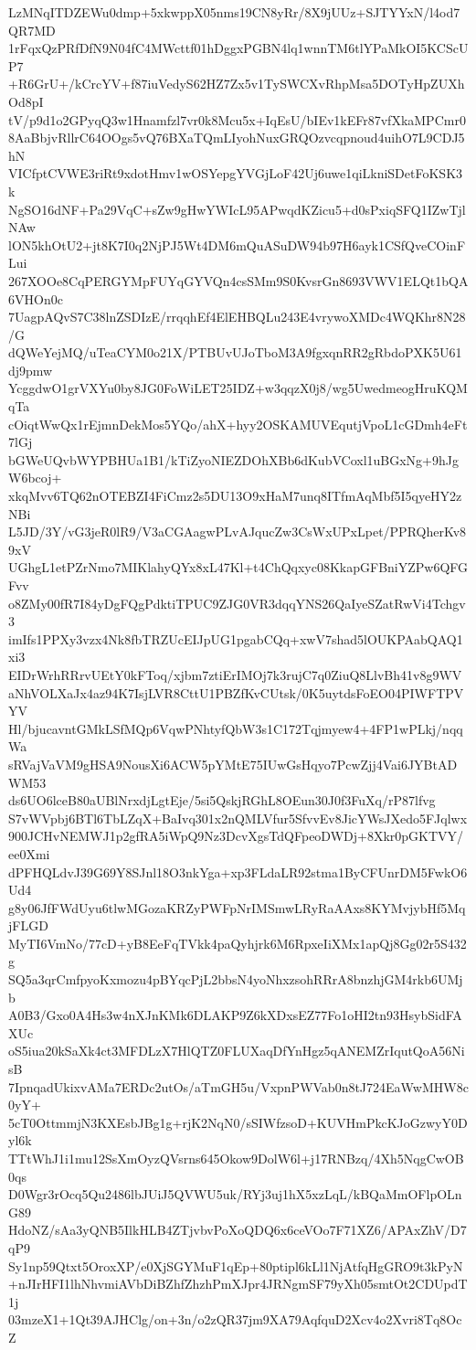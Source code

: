 LzMNqITDZEWu0dmp+5xkwppX05nms19CN8yRr/8X9jUUz+SJTYYxN/l4od7QR7MD
1rFqxQzPRfDfN9N04fC4MWcttf01hDggxPGBN4lq1wnnTM6tlYPaMkOI5KCScUP7
+R6GrU+/kCrcYV+f87iuVedyS62HZ7Zx5v1TySWCXvRhpMsa5DOTyHpZUXhOd8pI
tV/p9d1o2GPyqQ3w1Hnamfzl7vr0k8Mcu5x+IqEsU/bIEv1kEFr87vfXkaMPCmr0
8AaBbjvRllrC64OOgs5vQ76BXaTQmLIyohNuxGRQOzvcqpnoud4uihO7L9CDJ5hN
VICfptCVWE3riRt9xdotHmv1wOSYepgYVGjLoF42Uj6uwe1qiLkniSDetFoKSK3k
NgSO16dNF+Pa29VqC+sZw9gHwYWIcL95APwqdKZicu5+d0sPxiqSFQ1IZwTjlNAw
lON5khOtU2+jt8K7I0q2NjPJ5Wt4DM6mQuASuDW94b97H6ayk1CSfQveCOinFLui
267XOOe8CqPERGYMpFUYqGYVQn4csSMm9S0KvsrGn8693VWV1ELQt1bQA6VHOn0c
7UagpAQvS7C38lnZSDIzE/rrqqhEf4ElEHBQLu243E4vrywoXMDc4WQKhr8N28/G
dQWeYejMQ/uTeaCYM0o21X/PTBUvUJoTboM3A9fgxqnRR2gRbdoPXK5U61dj9pmw
YcggdwO1grVXYu0by8JG0FoWiLET25IDZ+w3qqzX0j8/wg5UwedmeogHruKQMqTa
cOiqtWwQx1rEjmnDekMos5YQo/ahX+hyy2OSKAMUVEqutjVpoL1cGDmh4eFt7lGj
bGWeUQvbWYPBHUa1B1/kTiZyoNIEZDOhXBb6dKubVCoxl1uBGxNg+9hJgW6bcoj+
xkqMvv6TQ62nOTEBZI4FiCmz2s5DU13O9xHaM7unq8ITfmAqMbf5I5qyeHY2zNBi
L5JD/3Y/vG3jeR0lR9/V3aCGAagwPLvAJqucZw3CsWxUPxLpet/PPRQherKv89xV
UGhgL1etPZrNmo7MIKlahyQYx8xL47Kl+t4ChQqxyc08KkapGFBniYZPw6QFGFvv
o8ZMy00fR7I84yDgFQgPdktiTPUC9ZJG0VR3dqqYNS26QaIyeSZatRwVi4Tchgv3
imIfs1PPXy3vzx4Nk8fbTRZUcEIJpUG1pgabCQq+xwV7shad5lOUKPAabQAQ1xi3
EIDrWrhRRrvUEtY0kFToq/xjbm7ztiErIMOj7k3rujC7q0ZiuQ8LlvBh41v8g9WV
aNhVOLXaJx4az94K7IsjLVR8CttU1PBZfKvCUtsk/0K5uytdsFoEO04PIWFTPVYV
Hl/bjucavntGMkLSfMQp6VqwPNhtyfQbW3s1C172Tqjmyew4+4FP1wPLkj/nqqWa
sRVajVaVM9gHSA9NousXi6ACW5pYMtE75IUwGsHqyo7PcwZjj4Vai6JYBtADWM53
ds6UO6lceB80aUBlNrxdjLgtEje/5si5QskjRGhL8OEun30J0f3FuXq/rP87lfvg
S7vWVpbj6BTl6TbLZqX+BaIvq301x2nQMLVfur5SfvvEv8JicYWsJXedo5FJqlwx
900JCHvNEMWJ1p2gfRA5iWpQ9Nz3DcvXgsTdQFpeoDWDj+8Xkr0pGKTVY/ee0Xmi
dPFHQLdvJ39G69Y8SJnl18O3nkYga+xp3FLdaLR92stma1ByCFUnrDM5FwkO6Ud4
g8y06JfFWdUyu6tlwMGozaKRZyPWFpNrIMSmwLRyRaAAxs8KYMvjybHf5MqjFLGD
MyTI6VmNo/77cD+yB8EeFqTVkk4paQyhjrk6M6RpxeIiXMx1apQj8Gg02r5S432g
SQ5a3qrCmfpyoKxmozu4pBYqcPjL2bbsN4yoNhxzsohRRrA8bnzhjGM4rkb6UMjb
A0B3/Gxo0A4Hs3w4nXJnKMk6DLAKP9Z6kXDxsEZ77Fo1oHI2tn93HsybSidFAXUc
oS5iua20kSaXk4ct3MFDLzX7HlQTZ0FLUXaqDfYnHgz5qANEMZrIqutQoA56NisB
7IpnqadUkixvAMa7ERDc2utOs/aTmGH5u/VxpnPWVab0n8tJ724EaWwMHW8c0yY+
5cT0OttmmjN3KXEsbJBg1g+rjK2NqN0/sSIWfzsoD+KUVHmPkcKJoGzwyY0Dyl6k
TTtWhJ1i1mu12SsXmOyzQVsrns645Okow9DolW6l+j17RNBzq/4Xh5NqgCwOB0qs
D0Wgr3rOcq5Qu2486lbJUiJ5QVWU5uk/RYj3uj1hX5xzLqL/kBQaMmOFlpOLnG89
HdoNZ/sAa3yQNB5IlkHLB4ZTjvbvPoXoQDQ6x6ceVOo7F71XZ6/APAxZhV/D7qP9
Sy1np59Qtxt5OroxXP/e0XjSGYMuF1qEp+80ptipl6kLl1NjAtfqHgGRO9t3kPyN
+nJIrHFI1lhNhvmiAVbDiBZhfZhzhPmXJpr4JRNgmSF79yXh05smtOt2CDUpdT1j
03mzeX1+1Qt39AJHClg/on+3n/o2zQR37jm9XA79AqfquD2Xcv4o2Xvri8Tq8OcZ
